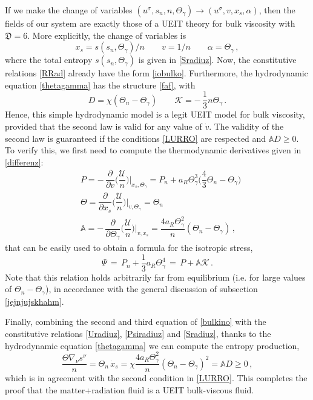 \documentclass[a4paper, amsfonts, amssymb, amsmath, reprint, twocolumn, showkeys, nofootinbib]{revtex4-2}
\begin{document}
If we make the change of variables $(u^\sigma,s_n,n,\Theta_\gamma) \longrightarrow (u^\sigma,v,x_s,\alpha)$, then the fields of our system are exactly those of a UEIT theory for bulk viscosity with $\mathfrak{D}=6$. More explicitly, the change of variables is  
\begin{equation}
x_s = s(s_n,\Theta_\gamma)/n  \quad \quad 
  v = 1/n \quad \quad  
\alpha = \Theta_\gamma \, , 
\end{equation}
where the total entropy $s(s_n,\Theta_\gamma)$ is given in \eqref{Sradiuz}. Now, the constitutive relations \eqref{RRad} already have the form \eqref{iobulko}. Furthermore, the hydrodynamic equation \eqref{thetagamma} has the structure \eqref{faf}, with
\begin{equation}
D = \chi (\Theta_n-\Theta_\gamma)   \quad \quad   \mathcal{K}=- \, \dfrac{1}{3} n \Theta_\gamma \, .
\end{equation}
Hence, this simple hydrodynamic model is a legit UEIT model for bulk viscosity, provided that the second law is valid for any value of $\dot{v}$. The validity of the second law is guaranteed if the conditions \eqref{LURRO} are respected and $\mathbb{A}D \geq 0$. To verify this, we first need to compute the thermodynamic derivatives given in \eqref{differenz}:
\begin{equation}
\begin{split}
& P = - \, \dfrac{\partial}{\partial v} \bigg( \dfrac{\mathcal{U}}{n} \bigg) \bigg|_{x_s,\Theta_\gamma} = P_n + a_R \Theta_\gamma^3 \bigg( \dfrac{4}{3} \Theta_n -\Theta_\gamma \bigg) \\
& \Theta = \dfrac{\partial}{\partial x_s} \bigg( \dfrac{\mathcal{U}}{n} \bigg) \bigg|_{v,\Theta_\gamma} = \Theta_n \\
& \mathbb{A}=- \, \dfrac{\partial }{\partial \Theta_\gamma}\bigg( \dfrac{\mathcal{U}}{n} \bigg) \bigg|_{v,x_s} = \dfrac{4a_R \Theta_\gamma^2}{n} (\Theta_n - \Theta_\gamma) \, ,
\end{split}
\end{equation}
that can be easily used  to obtain a formula for the isotropic stress, 
\begin{equation}
\Psi  \,= \, P_n + \dfrac{1}{3} a_R \Theta_\gamma^4 \, = \,P + \mathbb{A} \mathcal{K} \, .
\end{equation}
Note that this relation holds arbitrarily far from equilibrium (i.e. for large values of $\Theta_n-\Theta_\gamma$), in accordance with the general discussion of subsection \ref{jejnjujskhahm}.

Finally, combining the second and third equation of \eqref{bulkino} with the constitutive relations \eqref{Uradiuz}, \eqref{Psiradiuz} and \eqref{Sradiuz}, thanks to  the hydrodynamic equation \eqref{thetagamma} we can compute the entropy production,
\begin{equation}
\label{quandoiorpprodent}
\dfrac{\Theta \nabla_\nu s^\nu}{n} = \Theta_n \, \dot{x}_s = \chi \dfrac{4 a_R \Theta_\gamma^2}{n} (\Theta_n - \Theta_\gamma)^2 = \mathbb{A}D \geq 0 \, ,
\end{equation}
which is in agreement with the second condition in \eqref{LURRO}. 
This completes the proof  that the matter+radiation fluid is a UEIT bulk-viscous fluid.
\end{document}
